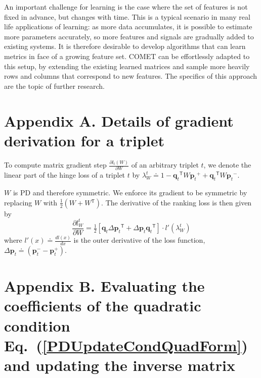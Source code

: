 \documentclass[twoside,11pt]{article}
\newcommand\mat[1]{{#1}}
\renewcommand\vec[1]{\mathbf{#1}}
\newcommand{\T}{{}^\mathsf{T}}
\newcommand{\W}{\mat{W}}
\newcommand{\eqdef}{\doteq}
\newcommand{\q}{{\vec{q}}}
\newcommand{\p}{{\vec{p}}}
\newcommand{\trip}{{t}}
\newcommand{\qt}{{\q_{\trip}}}
\newcommand{\pt}{{\p_{\trip}}}
\renewcommand{\eqref}[1]{Eq.~(\ref{#1})}
\begin{document}
An important challenge for learning is the case where the set of features is not fixed in advance, but changes with time. This is a typical scenario in many real life applications of learning: as more data accumulates, it is possible to estimate more parameters accurately, so more features and signals are gradually added to existing systems. It is therefore desirable to develop algorithms that can learn metrics in face of a growing feature set. COMET can be effortlessly adapted to this setup, by extending the existing learned matrices and sample more heavily rows and columns that correspond to new features. The specifics of this approach are the topic of further research.


\newpage

\appendix
\section*{Appendix A. Details of gradient derivation for a triplet}
\label{appendix-grad}

To compute matrix gradient step $\frac{\partial {l_t (\W)}}{\partial \W}$ of an arbitrary triplet $t$, we denote the linear part of the hinge loss of a triplet $t$ by $\lambda_{W}^t \eqdef 
1-\qt\T \W \pt^{+} + \qt\T\W\pt^{-}.$

$\W$ is PD and therefore symmetric. We enforce its gradient to be symmetric by replacing $\W$ with $\tfrac{1}{2}(\W + \W\T)$.
The derivative of the ranking loss is then given by
\begin{equation}
\frac{\partial {l_{\W}^{t}}}{\partial \W} = \tfrac{1}{2}[\vec{q}_{t}\Delta\vec{p}_{t}\T  + \Delta\vec{p}_{t}\vec{q}_{t}\T]\cdot {l'}(\lambda_{W}^t)
\label{dlossranking}
\nonumber 
\end{equation} where $l'(x) \eqdef \frac{d{l(x)}}{dx}$ is the outer derivative of the loss function, $\Delta\vec{p}_{t} \eqdef (\vec{p}_{t}^{-} - \vec{p}_{t}^{+})$.

\section*{Appendix B. Evaluating the coefficients of the quadratic condition \eqref{PDUpdateCondQuadForm} and updating the inverse matrix}
\label{appendix-inverse}
\end{document}
